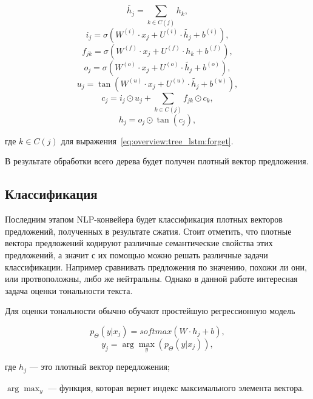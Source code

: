 \begin{equation}
  \tilde{h_j} = \sum_{k\in{C(j)}}h_k,
\end{equation}
\begin{equation}
  i_j = \sigma(W^{(i)}\cdot{x_j} + U^{(i)}\cdot{\tilde{h_j}} + b^{(i)}),
\end{equation}
\begin{equation}
  \label{eq:overview:tree_lstm:forget}
  f_{jk} = \sigma(W^{(f)}\cdot{x_j} + U^{(f)}\cdot{h_k} + b^{(f)}),
\end{equation}
\begin{equation}
  o_j = \sigma(W^{(o)}\cdot{x_j} + U^{(o)}\cdot{\tilde{h_j}} + b^{(o)}),
\end{equation}
\begin{equation}
  u_j = \tan(W^{(u)}\cdot{x_j} + U^{(u)}\cdot{\tilde{h_j}} + b^{(u)}),
\end{equation}
\begin{equation}
  c_j = i_j\odot{u_j} + \sum_{k\in{C(j)}}f_{jk}\odot{c_k},
\end{equation}
\begin{equation}
  h_j = o_j\odot{\tan(c_j)},
\end{equation}
\begin{explanationx}
\item [где] $k\in{C(j)}$ для выражения~\ref{eq:overview:tree_lstm:forget}.
\end{explanationx}

В результате обработки всего дерева будет получен плотный вектор предложения.

\subsection{Классификация}
Последним этапом NLP-конвейера будет классификация плотных векторов предложений, полученных в результате сжатия. Стоит отметить, что плотные вектора предложений кодируют различные семантические свойства этих предложений, а значит с их помощью можно решать различные задачи классификации. Например сравнивать предложения по значению, похожи ли они, или протвоположны, либо же нейтральны. Однако в данной работе интересная задача оценки тональности текста.

Для оценки тональности обычно обучают простейшую регрессионную модель

\begin{equation}
  p_{\Theta}(y|x_j) = softmax(W\cdot{h_j} + b),
\end{equation}
\begin{equation}
  y_j = \arg \max_y(p_{\Theta}(y|x_j)),
\end{equation}
\begin{explanationx}
\item[где] $h_j$ --- это плотный вектор передложения;
\item$\arg \max_y$ --- функция, которая вернет индекс максимального элемента вектора.
\end{explanationx}